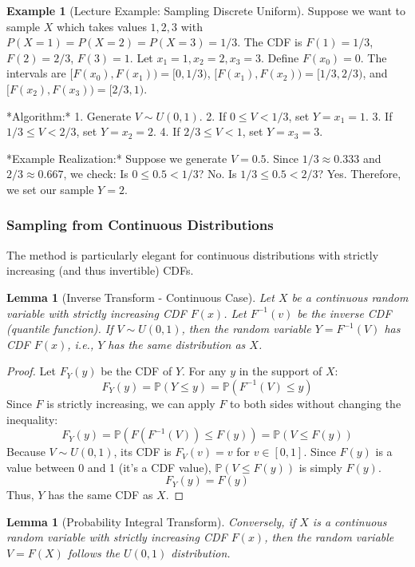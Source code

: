 \documentclass[11pt, letterpaper]{article}
\theoremstyle{plain} %
\newtheorem{lemma}[theorem]{Lemma}
\theoremstyle{definition} %
\newtheorem{example}[theorem]{Example} %
\theoremstyle{remark} %
\newcommand{\Prob}{\mathbb{P}} %
\begin{document}
\begin{example}[Lecture Example: Sampling Discrete Uniform] \label{ex:discrete_sample_impl}
Suppose we want to sample $X$ which takes values $1, 2, 3$ with $P(X=1)=P(X=2)=P(X=3)=1/3$.
The CDF is $F(1)=1/3$, $F(2)=2/3$, $F(3)=1$. Let $x_1=1, x_2=2, x_3=3$. Define $F(x_0)=0$.
The intervals are $[F(x_0), F(x_1)) = [0, 1/3)$, $[F(x_1), F(x_2)) = [1/3, 2/3)$, and $[F(x_2), F(x_3)) = [2/3, 1)$.

*Algorithm:*
1. Generate $V \sim U(0, 1)$.
2. If $0 \le V < 1/3$, set $Y = x_1 = 1$.
3. If $1/3 \le V < 2/3$, set $Y = x_2 = 2$.
4. If $2/3 \le V < 1$, set $Y = x_3 = 3$.

*Example Realization:* Suppose we generate $V = 0.5$.
Since $1/3 \approx 0.333$ and $2/3 \approx 0.667$, we check:
Is $0 \le 0.5 < 1/3$? No.
Is $1/3 \le 0.5 < 2/3$? Yes.
Therefore, we set our sample $Y = 2$.
\end{example}

\subsubsection{Sampling from Continuous Distributions}

The method is particularly elegant for continuous distributions with strictly increasing (and thus invertible) CDFs.

\begin{lemma}[Inverse Transform - Continuous Case] \label{lem:continuous_inv_transform}
Let $X$ be a continuous random variable with strictly increasing CDF $F(x)$. Let $F^{-1}(v)$ be the inverse CDF (quantile function). If $V \sim U(0, 1)$, then the random variable $Y = F^{-1}(V)$ has CDF $F(x)$, i.e., $Y$ has the same distribution as $X$.
\end{lemma}

\begin{proof}
Let $F_Y(y)$ be the CDF of $Y$. For any $y$ in the support of $X$:
\[
F_Y(y) = \Prob(Y \le y) = \Prob(F^{-1}(V) \le y)
\]
Since $F$ is strictly increasing, we can apply $F$ to both sides without changing the inequality:
\[
F_Y(y) = \Prob(F(F^{-1}(V)) \le F(y)) = \Prob(V \le F(y))
\]
Because $V \sim U(0, 1)$, its CDF is $F_V(v) = v$ for $v \in [0, 1]$. Since $F(y)$ is a value between 0 and 1 (it's a CDF value), $\Prob(V \le F(y))$ is simply $F(y)$.
\[
F_Y(y) = F(y)
\]
Thus, $Y$ has the same CDF as $X$.
\end{proof}

\begin{lemma}[Probability Integral Transform] \label{lem:pit}
Conversely, if $X$ is a continuous random variable with strictly increasing CDF $F(x)$, then the random variable $V = F(X)$ follows the $U(0, 1)$ distribution.
\end{lemma}
\end{document}
